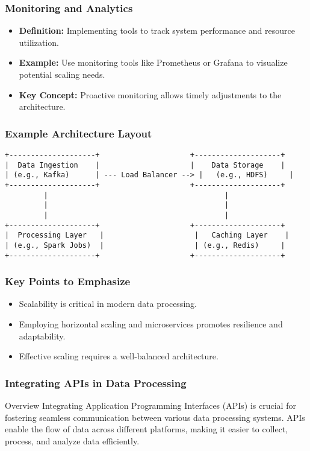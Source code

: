 \documentclass[aspectratio=169]{beamer}
\begin{document}
\begin{frame}[fragile]
    \frametitle{Monitoring and Analytics}
    \begin{itemize}
        \item \textbf{Definition:} Implementing tools to track system performance and resource utilization.
        \item \textbf{Example:} Use monitoring tools like Prometheus or Grafana to visualize potential scaling needs.
        \item \textbf{Key Concept:} Proactive monitoring allows timely adjustments to the architecture.
    \end{itemize}
\end{frame}

\begin{frame}[fragile]
    \frametitle{Example Architecture Layout}
    \begin{center}
        \begin{verbatim}
+--------------------+                     +--------------------+
|  Data Ingestion    |                     |    Data Storage    |
| (e.g., Kafka)      | --- Load Balancer --> |   (e.g., HDFS)     |
+--------------------+                     +--------------------+
         |                                         |
         |                                         |
         |                                         |
+--------------------+                     +--------------------+
|  Processing Layer   |                     |   Caching Layer    |
| (e.g., Spark Jobs)  |                     | (e.g., Redis)     |
+--------------------+                     +--------------------+
        \end{verbatim}
    \end{center}
\end{frame}

\begin{frame}[fragile]
    \frametitle{Key Points to Emphasize}
    \begin{itemize}
        \item Scalability is critical in modern data processing.
        \item Employing horizontal scaling and microservices promotes resilience and adaptability.
        \item Effective scaling requires a well-balanced architecture.
    \end{itemize}
\end{frame}

\begin{frame}
    \frametitle{Integrating APIs in Data Processing}
    \begin{block}{Overview}
        Integrating Application Programming Interfaces (APIs) is crucial for fostering seamless communication between various data processing systems. APIs enable the flow of data across different platforms, making it easier to collect, process, and analyze data efficiently.
    \end{block}
\end{frame}
\end{document}
